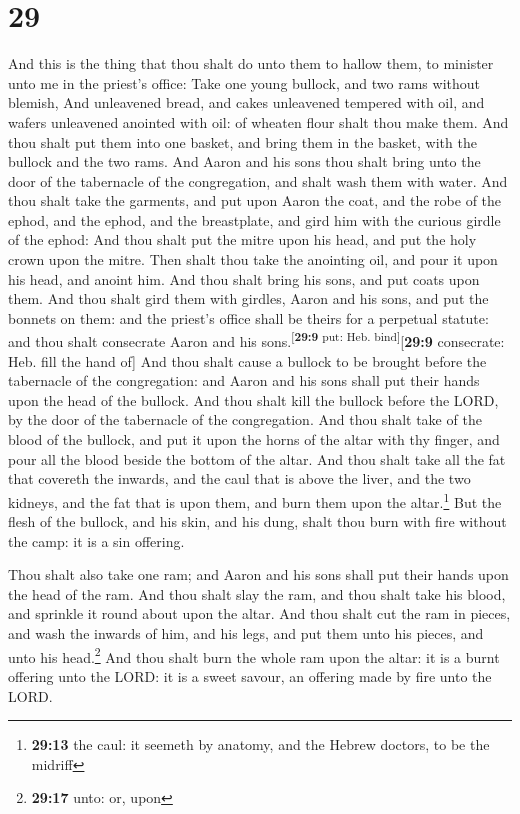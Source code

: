 \hypertarget{section-28}{%
\section{29}\label{section-28}}

 And this is the thing that thou shalt do unto them to
hallow them, to minister unto me in the priest's office: Take one young
bullock, and two rams without blemish,  And unleavened
bread, and cakes unleavened tempered with oil, and wafers unleavened
anointed with oil: of wheaten flour shalt thou make them. 
And thou shalt put them into one basket, and bring them in the basket,
with the bullock and the two rams.  And Aaron and his sons
thou shalt bring unto the door of the tabernacle of the congregation,
and shalt wash them with water.  And thou shalt take the
garments, and put upon Aaron the coat, and the robe of the ephod, and
the ephod, and the breastplate, and gird him with the curious girdle of
the ephod:  And thou shalt put the mitre upon his head,
and put the holy crown upon the mitre.  Then shalt thou
take the anointing oil, and pour it upon his head, and anoint him.
 And thou shalt bring his sons, and put coats upon them.
 And thou shalt gird them with girdles, Aaron and his
sons, and put the bonnets on them: and the priest's office shall be
theirs for a perpetual statute: and thou shalt consecrate Aaron and his
sons.\textsuperscript{{[}\textbf{29:9} put: Heb.
bind{]}}{[}\textbf{29:9} consecrate: Heb. fill the hand of{]}
 And thou shalt cause a bullock to be brought before the
tabernacle of the congregation: and Aaron and his sons shall put their
hands upon the head of the bullock.  And thou shalt kill
the bullock before the LORD, by the door of the tabernacle of the
congregation.  And thou shalt take of the blood of the
bullock, and put it upon the horns of the altar with thy finger, and
pour all the blood beside the bottom of the altar.  And
thou shalt take all the fat that covereth the inwards, and the caul that
is above the liver, and the two kidneys, and the fat that is upon them,
and burn them upon the altar.\footnote{\textbf{29:13} the caul: it
  seemeth by anatomy, and the Hebrew doctors, to be the midriff}
 But the flesh of the bullock, and his skin, and his
dung, shalt thou burn with fire without the camp: it is a sin offering.

 Thou shalt also take one ram; and Aaron and his sons
shall put their hands upon the head of the ram.  And thou
shalt slay the ram, and thou shalt take his blood, and sprinkle it round
about upon the altar.  And thou shalt cut the ram in
pieces, and wash the inwards of him, and his legs, and put them unto his
pieces, and unto his head.\footnote{\textbf{29:17} unto: or, upon}
 And thou shalt burn the whole ram upon the altar: it is
a burnt offering unto the LORD: it is a sweet savour, an offering made
by fire unto the LORD.

